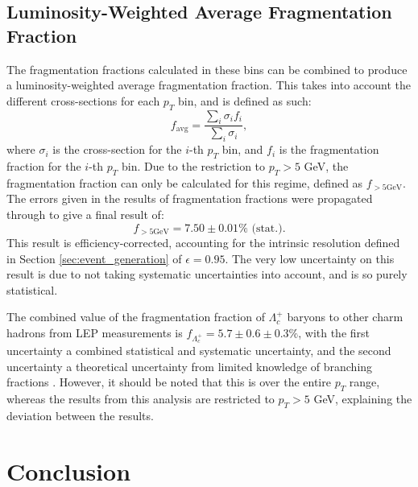 \documentclass[12pt]{article}
\begin{document}
\subsection{Luminosity-Weighted Average Fragmentation Fraction}
The fragmentation fractions calculated in these bins can be combined to produce a luminosity-weighted average fragmentation fraction. This takes into account the different cross-sections for each $p_T$ bin, and is defined as such:
\begin{equation}
    f_{\text{avg}} = \frac{\sum_{i} \sigma_i f_i}{\sum_{i} \sigma_i},
\end{equation}
where $\sigma_i$ is the cross-section for the $i$-th $p_T$ bin, and $f_i$ is the fragmentation fraction for the $i$-th $p_T$ bin. Due to the restriction to $p_T > 5$ GeV, the fragmentation fraction can only be calculated for this regime, defined as $f_{>5\text{GeV}}$. The errors given in the results of fragmentation fractions were propagated through to give a final result of:
\begin{equation}
    f_{>5\text{GeV}} = 7.50 \pm 0.01 \%\text{ (stat.)}.
\end{equation}
This result is efficiency-corrected, accounting for the intrinsic resolution defined in Section \ref{sec:event_generation} of $\epsilon = 0.95$. The very low uncertainty on this result is due to not taking systematic uncertainties into account, and is so purely statistical.

The combined value of the fragmentation fraction of $\Lambda_c^+$ baryons to other charm hadrons from LEP measurements is $f_{\Lambda_c^+} = 5.7 \pm 0.6 \pm 0.3\%$, with the first uncertainty a combined statistical and systematic uncertainty, and the second uncertainty a theoretical uncertainty from limited knowledge of branching fractions \cite{fragfrac_gladilin}. However, it should be noted that this is over the entire $p_T$ range, whereas the results from this analysis are restricted to $p_T > 5$ GeV, explaining the deviation between the results.






\newpage
\section{Conclusion}
\end{document}
